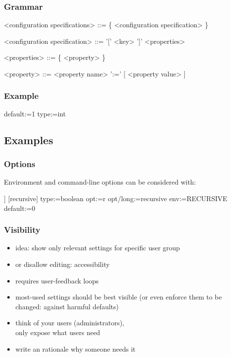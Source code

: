 \begin{frame}[fragile]
	\frametitle{Grammar}
	\begin{grammar}
	<configuration specifications> ::= \{ <configuration specification> \}

	<configuration specification> ::= '[' <key> ']' <properties>

	<properties> ::= \{ <property> \}

	<property> ::= <property name> ':=' [ <property value> ]
	\end{grammar}
\end{frame}


\begin{frame}[fragile]
	\frametitle{Example}
	\begin{code}
	default:=1
	type:=int
	\end{code}
\end{frame}

\subsection{Examples}

\begin{frame}[fragile]
	\frametitle{Options}

	Environment and command-line options can be considered with:

	\begin{code}[morekeywords={long},gobble=4]]
	[recursive]
	  type:=boolean
	  opt:=r
	  opt/long:=recursive
	  env:=RECURSIVE
	  default:=0
	\end{code}
\end{frame}

\begin{frame}
	\frametitle{Visibility}
	\begin{itemize}
	\item idea: show only relevant settings for specific user group
	\item or disallow editing: accessibility
	\pause
	\item requires user-feedback loops~\cite{xu2015hey}
	\item most-used settings should be best visible (or even enforce them to be changed: against harmful defaults)
	\item think of your users (administrators), \\ only expose what users need
	\item write an rationale why someone needs it
	\end{itemize}
\end{frame}

